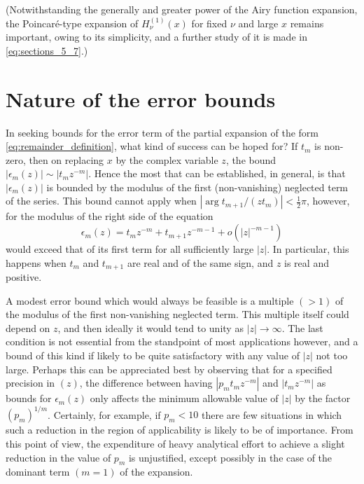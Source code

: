 \documentclass{article}
\begin{document}
(Notwithstanding the generally and greater power of the Airy function
expansion, the Poincar{\'e}-type expansion of $H_{\nu}^{(1)} (x)$ for fixed
$\nu$ and large $x$ remains important, owing to its simplicity, and a further
study of it is made in \eqref{eq:sections_5_7}.)

\section{Nature of the error bounds}\label{sec:nature_error_bounds}

In seeking bounds for the error term of the partial expansion of the form
\eqref{eq:remainder_definition}, what kind of success can be hoped for? If
$t_m$ is non-zero, then on replacing $x$ by the complex variable $z$, the
bound $| \epsilon_m (z) | \sim |t_m z^{- m} |$. Hence the most that can be
established, in general, is that $| \epsilon_m (z) |$ is bounded by the
modulus of the first (non-vanishing) neglected term of the series. This bound
cannot apply when $| \arg t_{m + 1} / (zt_m) | < \frac{1}{2} \pi$, however,
for the modulus of the right side of the equation
\begin{equation}
  \label{eq:error_bound_equation} \epsilon_m (z) = t_m z^{- m} + t_{m + 1}
  z^{- m - 1} + o (|z|^{- m - 1})
\end{equation}
would exceed that of its first term for all sufficiently large $|z|$. In
particular, this happens when $t_m$ and $t_{m + 1}$ are real and of the same
sign, and $z$ is real and positive.

A modest error bound which would always be feasible is a multiple $(> 1)$ of
the modulus of the first non-vanishing neglected term. This multiple itself
could depend on $z$, and then ideally it would tend to unity as $|z| \to
\infty$. The last condition is not essential from the standpoint of most
applications however, and a bound of this kind if likely to be quite
satisfactory with any value of $|z|$ not too large. Perhaps this can be
appreciated best by observing that for a specified precision in $(z)$, the
difference between having $|p_m t_m z^{- m} |$ and $|t_m z^{- m} |$ as bounds
for $\epsilon_m (z)$ only affects the minimum allowable value of $|z|$ by the
factor $(p_m)^{1 / m}$. Certainly, for example, if $p_m < 10$ there are few
situations in which such a reduction in the region of applicability is likely
to be of importance. From this point of view, the expenditure of heavy
analytical effort to achieve a slight reduction in the value of $p_m$ is
unjustified, except possibly in the case of the dominant term $(m = 1)$ of the
expansion.
\end{document}
